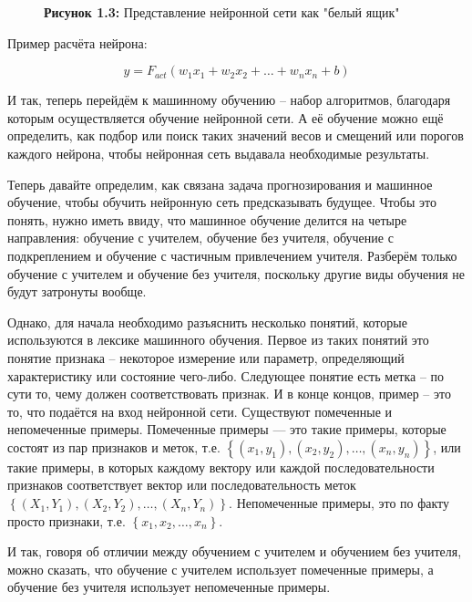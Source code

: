 {  \begin{figure}[htb]
    \centering
    \def\svgwidth{\textwidth}
    
    \caption*{{\bfseries Рисунок 1.3:} Представление нейронной сети как "белый ящик"}
    \label{fig:Neuron}
  \end{figure}

  \par \redline Пример расчёта нейрона:

  \[y = F_{act}\left(w_1x_1 + w_2x_2 + \dots + w_nx_n + b\right)\]

  \par \redline И так, теперь перейдём к машинному обучению – набор алгоритмов, благодаря которым осуществляется обучение нейронной сети. А её обучение можно ещё определить, как подбор или поиск таких значений весов и смещений или порогов каждого нейрона, чтобы нейронная сеть выдавала необходимые результаты. 

  \par \redline Теперь давайте определим, как связана задача прогнозирования и машинное обучение, чтобы обучить нейронную сеть предсказывать будущее. Чтобы это понять, нужно иметь ввиду, что машинное обучение делится на четыре направления: обучение с учителем, обучение без учителя, обучение с подкреплением и обучение с частичным привлечением учителя. Разберём только обучение с учителем и обучение без учителя, поскольку другие виды обучения не будут затронуты вообще. 

  \par \redline Однако, для начала необходимо разъяснить несколько понятий, которые используются в лексике машинного обучения. Первое из таких понятий это понятие признака – некоторое измерение или параметр, определяющий характеристику или состояние чего-либо. Следующее понятие есть метка – по сути то, чему должен соответствовать признак.  И в конце концов, пример – это то, что подаётся на вход нейронной сети. Существуют помеченные и непомеченные примеры. Помеченные примеры — это такие примеры, которые состоят из пар признаков и меток, т.е. $\left\{\left(x_{1}, y_{1}\right), \left(x_{2}, y_{2}\right), \dots, \left(x_{n}, y_{n}\right)\right\}$, или такие примеры, в которых каждому вектору или каждой последовательности признаков соответствует вектор или последовательность меток $\left\{\left(X_{1}, Y_{1}\right), \left(X_{2}, Y_{2}\right), \dots, \left(X_{n}, Y_{n}\right)\right\}$. Непомеченные примеры, это по факту просто признаки, т.е. $\left\{x_{1}, x_{2}, \dots, x_{n}\right\}$. 

  \par \redline И так, говоря об отличии между обучением с учителем и обучением без учителя, можно сказать, что обучение с учителем использует помеченные примеры, а обучение без учителя использует непомеченные примеры. 

}

